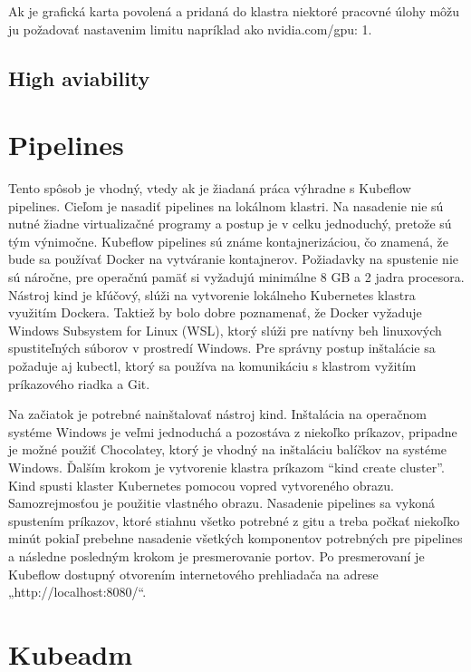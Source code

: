 Ak je grafická karta povolená a pridaná do klastra niektoré pracovné úlohy môžu ju požadovať nastavenim limitu napríklad ako nvidia.com/gpu: 1.

\subsection{High aviability}

\section{Pipelines}

Tento spôsob je vhodný, vtedy ak je žiadaná práca výhradne s Kubeflow pipelines. Cieľom je nasadiť pipelines na lokálnom klastri. Na nasadenie nie sú nutné žiadne virtualizačné programy a postup je v celku jednoduchý, pretože sú tým výnimočne. Kubeflow pipelines sú známe kontajnerizáciou, čo znamená, že bude sa používať Docker na vytváranie kontajnerov. Požiadavky na spustenie nie sú náročne, pre operačnú pamäť si vyžadujú minimálne 8 GB a 2 jadra procesora. Nástroj kind je kľúčový, slúži na vytvorenie lokálneho Kubernetes klastra využitím Dockera. Taktiež by bolo dobre poznamenať, že Docker vyžaduje Windows Subsystem for Linux (WSL), ktorý slúži pre natívny beh linuxových spustiteľných súborov v prostredí Windows. Pre správny postup inštalácie sa požaduje aj kubectl, ktorý sa používa na komunikáciu s klastrom vyžitím príkazového riadka a Git.

Na začiatok je potrebné nainštalovať nástroj kind. Inštalácia na operačnom systéme Windows je veľmi jednoduchá a pozostáva z niekoľko príkazov, pripadne je možné použiť Chocolatey, ktorý je vhodný na inštaláciu balíčkov na systéme Windows. Ďalším krokom je vytvorenie klastra príkazom “kind create cluster”.  Kind spusti klaster Kubernetes pomocou vopred vytvoreného obrazu. Samozrejmosťou je použitie vlastného obrazu. Nasadenie pipelines sa vykoná spustením príkazov, ktoré stiahnu všetko potrebné z gitu a treba počkať niekoľko minút pokiaľ prebehne nasadenie všetkých komponentov potrebných pre pipelines a následne posledným krokom je presmerovanie portov. Po presmerovaní je Kubeflow dostupný otvorením internetového prehliadača na adrese „http://localhost:8080/“.

\section{Kubeadm}

